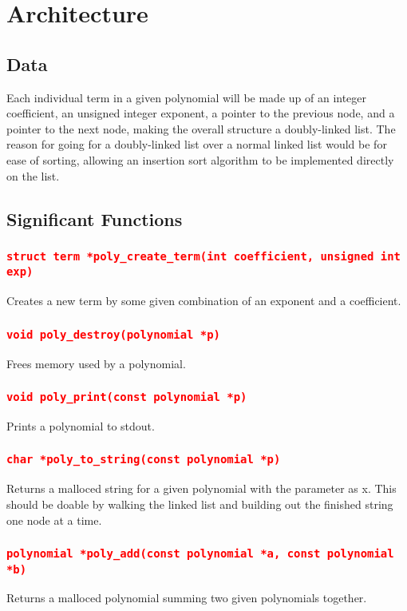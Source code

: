 \documentclass[11pt]{report}
\begin{document}
\section*{Architecture}
\subsection*{Data}
Each individual term in a given polynomial will be made up of an integer coefficient, an unsigned integer exponent, a pointer to the previous node, and a pointer to the next node, making the overall structure a doubly-linked list. The reason for going for a doubly-linked list over a normal linked list would be for ease of sorting, allowing an insertion sort algorithm to be implemented directly on the list.
\pagebreak
\subsection*{Significant Functions}
\subsubsection*{\texttt{\textcolor{red}{struct term *poly\_create\_term(int coefficient, unsigned int exp)}}}
Creates a new term by some given combination of an exponent and a coefficient.
\subsubsection*{\texttt{\textcolor{red}{void poly\_destroy(polynomial *p)}}}
Frees memory used by a polynomial.
\subsubsection*{\texttt{\textcolor{red}{void poly\_print(const polynomial *p)}}}
Prints a polynomial to stdout.
\subsubsection*{\texttt{\textcolor{red}{char *poly\_to\_string(const polynomial *p)}}}
Returns a malloced string for a given polynomial with the parameter as x. This should be doable by walking the linked list and building out the finished string one node at a time.
\subsubsection*{\texttt{\textcolor{red}{polynomial *poly\_add(const polynomial *a, const polynomial *b)}}}
Returns a malloced polynomial summing two given polynomials together.
\end{document}
